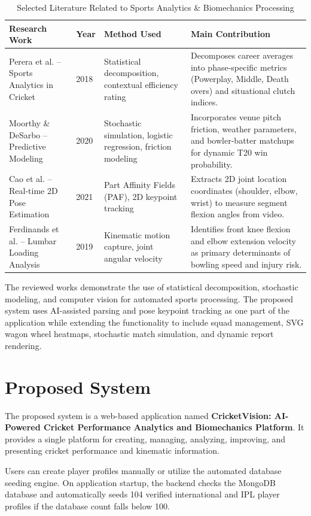 \begin{table}[H]
\centering
\caption{Selected Literature Related to Sports Analytics \& Biomechanics Processing}
\label{tab:lit_survey}
\begin{tabular}{p{3.2cm} p{1.2cm} p{3.8cm} p{5.2cm}}
\toprule
\textbf{Research Work} & \textbf{Year} & \textbf{Method Used} & \textbf{Main Contribution} \\
\midrule
Perera et al. -- Sports Analytics in Cricket & 2018 & Statistical decomposition, contextual efficiency rating & Decomposes career averages into phase-specific metrics (Powerplay, Middle, Death overs) and situational clutch indices. \\
Moorthy \& DeSarbo -- Predictive Modeling & 2020 & Stochastic simulation, logistic regression, friction modeling & Incorporates venue pitch friction, weather parameters, and bowler-batter matchups for dynamic T20 win probability. \\
Cao et al. -- Real-time 2D Pose Estimation & 2021 & Part Affinity Fields (PAF), 2D keypoint tracking & Extracts 2D joint location coordinates (shoulder, elbow, wrist) to measure segment flexion angles from video. \\
Ferdinands et al. -- Lumbar Loading Analysis & 2019 & Kinematic motion capture, joint angular velocity & Identifies front knee flexion and elbow extension velocity as primary determinants of bowling speed and injury risk. \\
\bottomrule
\end{tabular}
\end{table}

The reviewed works demonstrate the use of statistical decomposition, stochastic modeling, and computer vision for automated sports processing. The proposed system uses AI-assisted parsing and pose keypoint tracking as one part of the application while extending the functionality to include squad management, SVG wagon wheel heatmaps, stochastic match simulation, and dynamic report rendering.

\section{Proposed System}
The proposed system is a web-based application named \textbf{CricketVision: AI-Powered Cricket Performance Analytics and Biomechanics Platform}. It provides a single platform for creating, managing, analyzing, improving, and presenting cricket performance and kinematic information.

Users can create player profiles manually or utilize the automated database seeding engine. On application startup, the backend checks the MongoDB database and automatically seeds 104 verified international and IPL player profiles if the database count falls below 100.

